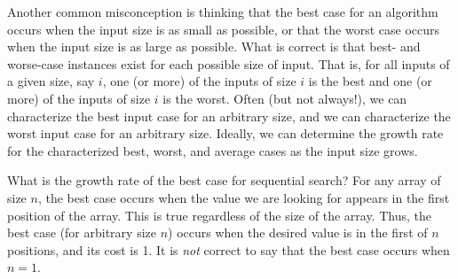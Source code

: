 Another common misconception is thinking that the best case for an
algorithm occurs when the input size is as small as possible, or that
the worst case occurs when the input size is as large as possible.
What is correct is that best- and worse-case instances exist for
each possible size of input.
That is, for all inputs of a given size, say \(i\), one (or more) of
the inputs of size \(i\) is the best and one (or more) of the
inputs of size \(i\) is the worst.
Often (but not always!), we can characterize the best input case for
an arbitrary size, and we can characterize the worst input case for an
arbitrary size.
Ideally, we can determine the growth rate for the characterized best,
worst, and average cases as the input size grows.

\begin{example}
What is the growth rate of the best case for sequential search?
For any array of size \(n\), the best case occurs when the value we
are looking for appears in the first position of the array.
This is true regardless of the size of the array.
Thus, the best case (for arbitrary size \(n\)) occurs when the desired
value is in the first of \(n\) positions, and its cost is 1.
It is \emph{not} correct to say that the best case occurs
when \(n=1\).
\end{example}

